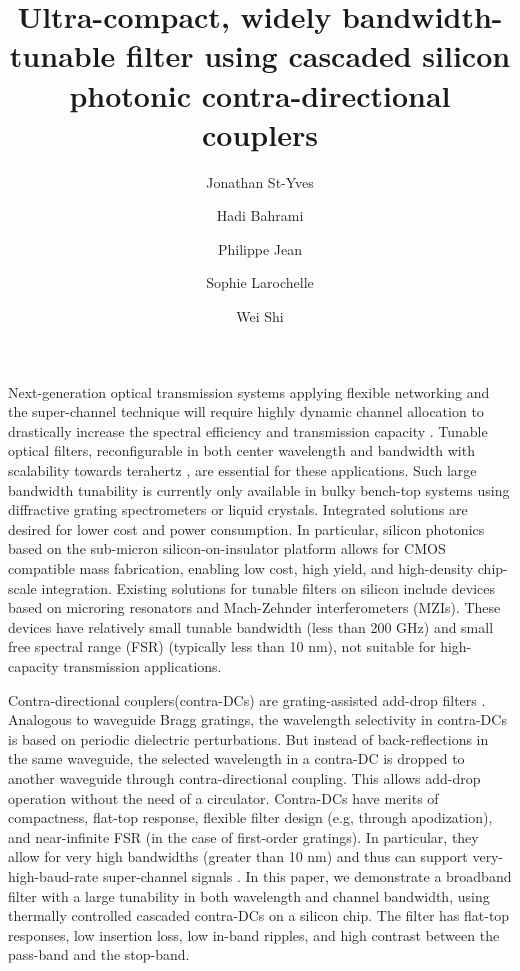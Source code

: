 \documentclass[9pt,twocolumn,twoside]{osajnl}
\title{Ultra-compact, widely bandwidth-tunable filter using cascaded silicon photonic contra-directional couplers}
\author[1]{Jonathan St-Yves}
\author[1]{Hadi Bahrami}
\author[1]{Philippe Jean}
\author[1]{Sophie Larochelle}
\author[1,*]{Wei Shi}
\affil[1]{Centre d'optique, photonique et laser (COPL) and Département de génie électrique et génie informatique, Université Laval, 2375 rue de la Terrasse, Québec (Québec), Canada, G1V 0A6}
\affil[*]{Corresponding author: wei.shi@gel.ulaval.ca}
\begin{document}
\maketitle
\thispagestyle{fancy}


Next-generation optical transmission systems applying flexible networking and the super-channel technique will require highly dynamic channel allocation to drastically increase the spectral efficiency and transmission capacity \cite{jinno2009spectrum, geisler2011demonstration}.
Tunable optical filters, reconfigurable in both center wavelength and bandwidth with scalability towards terahertz \cite{geisler2011demonstration}, are essential for these applications.
Such large bandwidth tunability is currently only available in bulky bench-top systems using diffractive grating spectrometers or liquid crystals.
Integrated solutions are desired for lower cost and power consumption.
In particular, silicon photonics  based on the sub-micron silicon-on-insulator platform allows for CMOS compatible mass fabrication, enabling low cost, high yield, and high-density chip-scale integration.
Existing solutions for tunable  filters on silicon include devices based on microring resonators \cite{DynamicBW, ong2013ultra} and Mach-Zehnder interferometers (MZIs). These devices have relatively small tunable bandwidth (less than 200 GHz) and small free spectral range (FSR) (typically less than 10 nm), not suitable for high-capacity transmission applications.

Contra-directional couplers(contra-DCs) are grating-assisted add-drop filters \cite{shi2013siliconContraDC}. 
Analogous to waveguide Bragg gratings, the wavelength selectivity in contra-DCs is based on periodic dielectric perturbations. But instead of back-reflections in the same waveguide, the selected wavelength in a contra-DC is dropped to another waveguide through contra-directional coupling.
This allows add-drop operation without the need of a circulator. 
Contra-DCs have merits of compactness, flat-top response, flexible filter design (e.g, through apodization), and near-infinite FSR (in the case of first-order gratings).
In particular, they allow for very high bandwidths (greater than 10 nm) and thus can support very-high-baud-rate super-channel signals \cite{jinno2009spectrum}.
In this paper, we demonstrate a broadband filter with a large tunability in both wavelength and channel bandwidth, using thermally controlled cascaded contra-DCs on a silicon chip. 
The filter has flat-top responses, low insertion loss, low in-band ripples, and high contrast between the pass-band and the stop-band.
\end{document}

